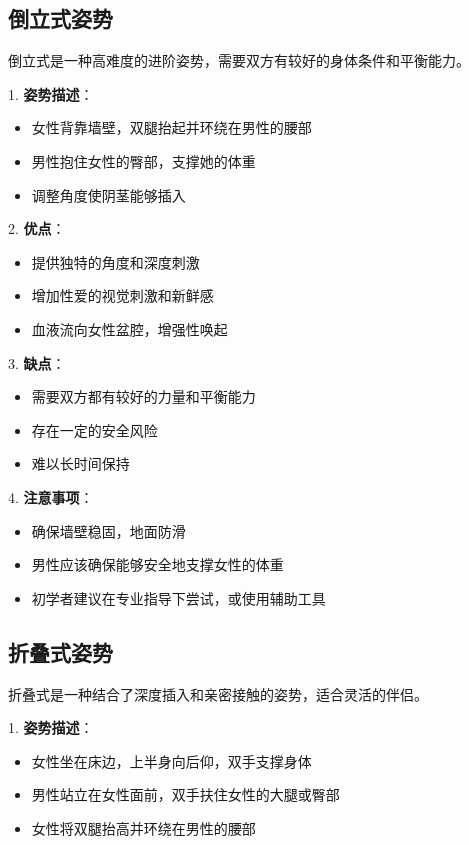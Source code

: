 \documentclass[12pt,UTF8]{ctexbook}
\begin{document}
\subsection{倒立式姿势}

倒立式是一种高难度的进阶姿势，需要双方有较好的身体条件和平衡能力。

1. \textbf{姿势描述}：
  \begin{itemize}
  \item 女性背靠墙壁，双腿抬起并环绕在男性的腰部
  \item 男性抱住女性的臀部，支撑她的体重
  \item 调整角度使阴茎能够插入
  \end{itemize}

2. \textbf{优点}：
  \begin{itemize}
  \item 提供独特的角度和深度刺激
  \item 增加性爱的视觉刺激和新鲜感
  \item 血液流向女性盆腔，增强性唤起
  \end{itemize}

3. \textbf{缺点}：
  \begin{itemize}
  \item 需要双方都有较好的力量和平衡能力
  \item 存在一定的安全风险
  \item 难以长时间保持
  \end{itemize}

4. \textbf{注意事项}：
  \begin{itemize}
  \item 确保墙壁稳固，地面防滑
  \item 男性应该确保能够安全地支撑女性的体重
  \item 初学者建议在专业指导下尝试，或使用辅助工具
  \end{itemize}

\subsection{折叠式姿势}

折叠式是一种结合了深度插入和亲密接触的姿势，适合灵活的伴侣。

1. \textbf{姿势描述}：
  \begin{itemize}
  \item 女性坐在床边，上半身向后仰，双手支撑身体
  \item 男性站立在女性面前，双手扶住女性的大腿或臀部
  \item 女性将双腿抬高并环绕在男性的腰部
  \end{itemize}
\end{document}
